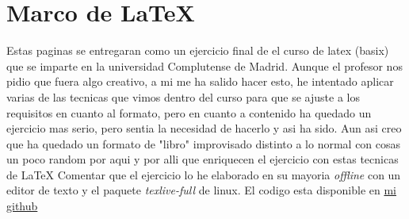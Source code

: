 \section{Marco de \LaTeX}
Estas paginas se entregaran como un ejercicio final de el curso de latex (basix) que se imparte en la universidad Complutense de Madrid. Aunque el profesor nos pidio que fuera algo creativo, a mi me ha salido hacer esto, he intentado aplicar varias de las tecnicas que vimos dentro del curso para que se ajuste a los requisitos en cuanto al formato, pero en cuanto a contenido ha quedado un ejercicio mas serio, pero sentia la necesidad de hacerlo y asi ha sido. Aun asi creo que ha quedado un formato de "libro" improvisado distinto a lo normal con cosas un poco random por aqui y por alli que enriquecen el ejercicio con estas tecnicas de \LaTeX
Comentar que el ejercicio lo he elaborado en su mayoria \textit{offline} con un editor de texto y el paquete \textit{texlive-full} de linux. El codigo esta disponible en \href{https://github.com/dlgeraghty/basix-latex/tree/master/independencia/template}{mi github} 

